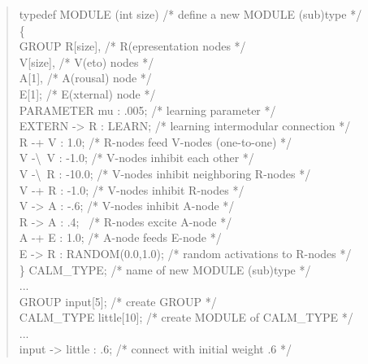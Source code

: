 \documentclass[11pt, a4paper]{article}
\begin{document}
\begin{quote}
\ttfamily\small
typedef MODULE (int size) \quad /* define a new MODULE (sub)type */\\
\{\\
\hspace*{1.5em}GROUP \quad R[size], \qquad\qquad /* R(epresentation nodes */\\
\hspace*{5.2em}V[size], \qquad\qquad /* V(eto) nodes */\\
\hspace*{5.2em}A[1], \qquad\qquad\quad /* A(rousal) node */\\
\hspace*{5.2em}E[1]; \qquad\qquad\quad /* E(xternal) node */\\
\hspace*{1.5em}PARAMETER mu : .005; \quad /* learning parameter */\\[0.4em]
\hspace*{1.5em}EXTERN -> R : LEARN; \quad /* learning intermodular connection */\\
\hspace*{1.5em}R -+ V : 1.0; \qquad\qquad /* R-nodes feed V-nodes (one-to-one) */\\
\hspace*{1.5em}V -\textbackslash\ V : -1.0; \qquad\qquad /* V-nodes inhibit each other */\\
\hspace*{1.5em}V -\textbackslash\ R : -10.0; \qquad\quad /* V-nodes inhibit neighboring R-nodes */\\
\hspace*{1.5em}V -+ R : -1.0; \qquad\quad /* V-nodes inhibit R-nodes */\\
\hspace*{1.5em}V -> A : -.6; \qquad\qquad /* V-nodes inhibit A-node */\\
\hspace*{1.5em}R -> A : .4; \qquad\qquad\ /* R-nodes excite A-node */\\
\hspace*{1.5em}A -+ E : 1.0; \qquad\qquad /* A-node feeds E-node */\\
\hspace*{1.5em}E -> R : RANDOM(0.0,1.0); /* random activations to R-nodes */\\
\} CALM\_TYPE; \qquad\qquad\quad /* name of new MODULE (sub)type */\\
...\\
GROUP \qquad input[5]; \qquad\quad /* create GROUP */\\
CALM\_TYPE little[10]; \quad /* create MODULE of CALM\_TYPE */\\
...\\
input -> little : .6; \qquad\quad /* connect with initial weight .6 */
\end{quote}
\end{document}
